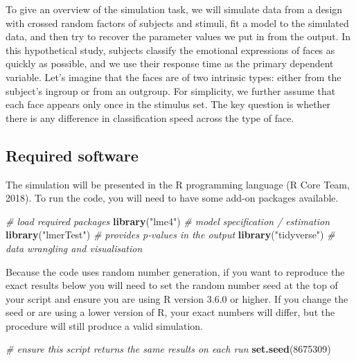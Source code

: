 \documentclass[doc,floatsintext]{apa6}
\newenvironment{Shaded}{\begin{snugshade}}{\end{snugshade}}
\newcommand{\KeywordTok}[1]{\textcolor[rgb]{0.13,0.29,0.53}{\textbf{#1}}}
\newcommand{\DecValTok}[1]{\textcolor[rgb]{0.00,0.00,0.81}{#1}}
\newcommand{\StringTok}[1]{\textcolor[rgb]{0.31,0.60,0.02}{#1}}
\newcommand{\CommentTok}[1]{\textcolor[rgb]{0.56,0.35,0.01}{\textit{#1}}}
\newcommand{\NormalTok}[1]{#1}
\begin{document}
To give an overview of the simulation task, we will simulate data from a
design with crossed random factors of subjects and stimuli, fit a model
to the simulated data, and then try to recover the parameter values we
put in from the output. In this hypothetical study, subjects classify
the emotional expressions of faces as quickly as possible, and we use
their response time as the primary dependent variable. Let's imagine
that the faces are of two intrinsic types: either from the subject's
ingroup or from an outgroup. For simplicity, we further assume that each
face appears only once in the stimulus set. The key question is whether
there is any difference in classification speed across the type of face.

\subsection{Required software}\label{required-software}

The simulation will be presented in the R programming language (R Core
Team, 2018). To run the code, you will need to have some add-on packages
available.

\begin{Shaded}
\begin{Highlighting}[]
\CommentTok{# load required packages}
\KeywordTok{library}\NormalTok{(}\StringTok{"lme4"}\NormalTok{)        }\CommentTok{# model specification / estimation}
\KeywordTok{library}\NormalTok{(}\StringTok{"lmerTest"}\NormalTok{)    }\CommentTok{# provides p-values in the output}
\KeywordTok{library}\NormalTok{(}\StringTok{"tidyverse"}\NormalTok{)   }\CommentTok{# data wrangling and visualisation}
\end{Highlighting}
\end{Shaded}

Because the code uses random number generation, if you want to reproduce
the exact results below you will need to set the random number seed at
the top of your script and ensure you are using R version 3.6.0 or
higher. If you change the seed or are using a lower version of R, your
exact numbers will differ, but the procedure will still produce a valid
simulation.

\begin{Shaded}
\begin{Highlighting}[]
\CommentTok{# ensure this script returns the same results on each run}
\KeywordTok{set.seed}\NormalTok{(}\DecValTok{8675309}\NormalTok{)}
\end{Highlighting}
\end{Shaded}
\end{document}
